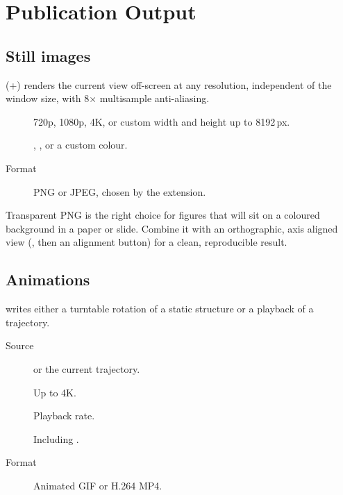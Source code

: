 \chapter{Publication Output}
\label{ch:output}

\section{Still images}

\menusep{}\menusep{}
(+) renders the current view off-screen at any resolution,
independent of the window size, with 8$\times$ multisample anti-aliasing.

\begin{description}
  \item[] 720p, 1080p, 4K, or custom width and
    height up to 8192\,px.
  \item[] , , or
    a custom colour.
  \item[Format] PNG or JPEG, chosen by the extension.
\end{description}

\begin{caltip}
Transparent PNG is the right choice for figures that will sit on a coloured
background in a paper or slide. Combine it with an orthographic, axis
aligned view (, then an alignment button) for a clean, reproducible
result.
\end{caltip}

\section{Animations}

\menusep{}\menusep{} writes either a turntable rotation of a static structure or a
playback of a trajectory.

\begin{description}
  \item[Source]  or the current
    trajectory.
  \item[] Up to 4K.
  \item[] Playback rate.
  \item[] Including .
  \item[Format] Animated GIF or H.264 MP4.
\end{description}

